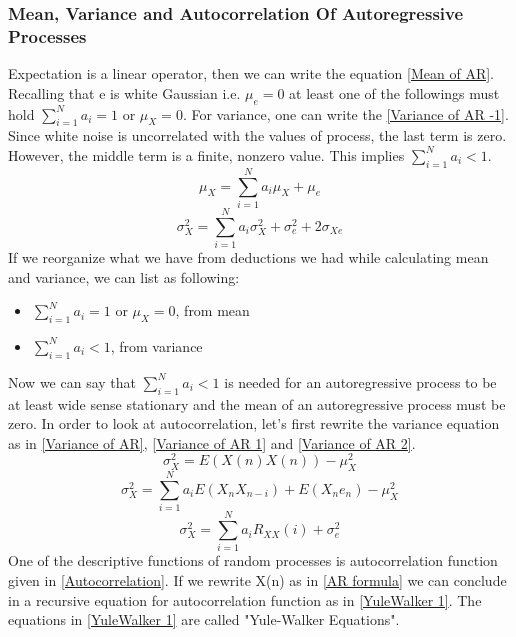 \subsubsection{Mean, Variance and Autocorrelation Of Autoregressive Processes}
Expectation is a linear operator, then we can write the equation \ref{Mean of AR}. Recalling that e is white Gaussian i.e. $\mu_e=0$ at least one of the followings must hold $\sum_{i=1}^{N}a_i = 1$ or $\mu_X = 0$. For variance, one can write the \ref{Variance of AR -1}. Since white noise is uncorrelated with the values of process, the last term is zero. However, the middle term is a finite, nonzero value. This implies $\sum_{i=1}^{N}a_i < 1$. 
\begin{equation}\label{Mean of AR}
\mu_X = \sum_{i=1}^{N}{a_i\mu_X} + \mu_e 
\end{equation}
\begin{equation}\label{Variance of AR -1}
\sigma_{X}^2 = \sum_{i=1}^{N}{a_i\sigma_X^2} + \sigma_e^2 + 2\sigma_{Xe} 
\end{equation}
If we reorganize what we have from deductions we had while calculating mean and variance, we can list as following:
\begin{itemize}
	\item $\sum_{i=1}^{N}a_i = 1$ or $\mu_X = 0$, from mean
	\item $\sum_{i=1}^{N}a_i < 1$, from variance
\end{itemize}
Now we can say that $\sum_{i=1}^{N}a_i < 1$ is needed for an autoregressive process to be at least wide sense stationary and the mean of an autoregressive process must be zero.\linebreak
In order to look at autocorrelation, let's first rewrite the variance equation as in \ref{Variance of AR}, \ref{Variance of AR 1} and \ref{Variance of AR 2}.
\begin{equation}\label{Variance of AR}
\sigma_{X}^2 = E(X(n)X(n)) - \mu_{X}^2 
\end{equation}
\begin{equation}\label{Variance of AR 1}
\sigma_{X}^2 = \sum_{i=1}^{N}a_iE(X_nX_{n-i}) + E(X_ne_n) - \mu_{X}^2 
\end{equation}
\begin{equation}\label{Variance of AR 2}
\sigma_{X}^2 = \sum_{i=1}^{N}a_iR_{XX}(i) + \sigma_e^2
\end{equation}
One of the descriptive functions of random processes is autocorrelation function given in \ref{Autocorrelation}. If we rewrite X(n) as in \ref{AR formula} we can conclude in a recursive equation for autocorrelation function as in \ref{YuleWalker 1}. The equations in \ref{YuleWalker 1} are called "Yule-Walker Equations".
